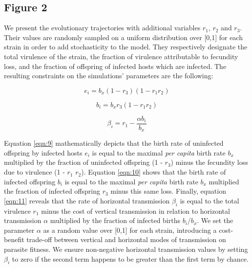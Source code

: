 \subsection{Figure 2}

We present the evolutionary trajectories with additional variables $r_1$,
$r_2$ and $r_3$. Their values are randomly sampled on a uniform distribution
over [0,1] for each strain in order to add stochasticity to the model. They
respectively designate the total virulence of the strain, the fraction of
virulence attributable to fecundity loss, and the fraction of offspring of
infected hosts which are infected. The resulting constraints on the simulations’
parameters are the following:

\begin{equation}
e_i = b_x(1 - r_3)(1- r_1 r_2)
\label{eqn:9}
\end{equation}

\begin{equation}
b_i = b_x r_3(1 - r_1 r_2)
\label{eqn:10}
\end{equation}

\begin{equation}
\beta_i = r_1 - \frac{\alpha b_i}{b_x}
\label{eqn:11}
\end{equation}

Equation \ref{eqn:9} mathematically depicts that the birth rate of uninfected
offspring by infected hosts $e_i$ is equal to the maximal \emph{per capita}
birth rate $b_x$ multiplied by the fraction of uninfected offspring (1 - $r_3$)
minus the fecundity loss due to virulence (1 - $r_1$ $r_2$). Equation
\ref{eqn:10} shows that the birth rate of infected offspring $b_i$ is equal to
the maximal \emph{per capita} birth rate $b_x$ multiplied the fraction of
infected offspring $r_3$ minus this same loss. Finally, equation \ref{eqn:11}
reveals that the rate of horizontal transmission $\beta_i$ is equal to the
total virulence $r_1$ minus the cost of vertical transmission in relation to
horizontal transmission $\alpha$ multiplied by the fraction of infected births
$b_i$/$b_x$. We set the parameter $\alpha$ as a random value over [0,1] for each
strain, introducing a cost-benefit trade-off between vertical and horizontal
modes of transmission on parasite fitness. We ensure non-negative horizontal
transmission values by setting $\beta_i$ to zero if the second term happens to
be greater than the first term by chance.

